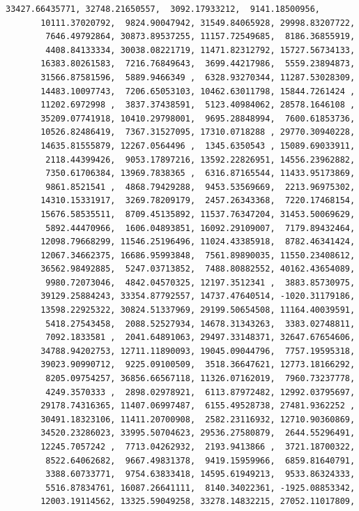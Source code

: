 \documentclass[11pt]{article}
\begin{document}
\begin{tcolorbox}[breakable, size=fbox, boxrule=.5pt, pad at break*=1mm, opacityfill=0]
\begin{Verbatim}[commandchars=\\\{\}]
       33427.66435771, 32748.21650557,  3092.17933212,  9141.18500956,
       10111.37020792,  9824.90047942, 31549.84065928, 29998.83207722,
        7646.49792864, 30873.89537255, 11157.72549685,  8186.36855919,
        4408.84133334, 30038.08221719, 11471.82312792, 15727.56734133,
       16383.80261583,  7216.76849643,  3699.44217986,  5559.23894873,
       31566.87581596,  5889.9466349 ,  6328.93270344, 11287.53028309,
       14483.10097743,  7206.65053103, 10462.63011798, 15844.7261424 ,
       11202.6972998 ,  3837.37438591,  5123.40984062, 28578.1646108 ,
       35209.07741918, 10410.29798001,  9695.28848994,  7600.61853736,
       10526.82486419,  7367.31527095, 17310.0718288 , 29770.30940228,
       14635.81555879, 12267.0564496 ,  1345.6350543 , 15089.69033911,
        2118.44399426,  9053.17897216, 13592.22826951, 14556.23962882,
        7350.61706384, 13969.7838365 ,  6316.87165544, 11433.95173869,
        9861.8521541 ,  4868.79429288,  9453.53569669,  2213.96975302,
       14310.15331917,  3269.78209179,  2457.26343368,  7220.17468154,
       15676.58535511,  8709.45135892, 11537.76347204, 31453.50069629,
        5892.44470966,  1606.04893851, 16092.29109007,  7179.89432464,
       12098.79668299, 11546.25196496, 11024.43385918,  8782.46341424,
       12067.34662375, 16686.95993848,  7561.89890035, 11550.23408612,
       36562.98492885,  5247.03713852,  7488.80882552, 40162.43654089,
        9980.72073046,  4842.04570325, 12197.3512341 ,  3883.85730975,
       39129.25884243, 33354.87792557, 14737.47640514, -1020.31179186,
       13598.22925322, 30824.51337969, 29199.50654508, 11164.40039591,
        5418.27543458,  2088.52527934, 14678.31343263,  3383.02748811,
        7092.1833581 ,  2041.64891063, 29497.33148371, 32647.67654606,
       34788.94202753, 12711.11890093, 19045.09044796,  7757.19595318,
       39023.90990712,  9225.09100509,  3518.36647621, 12773.18166292,
        8205.09754257, 36856.66567118, 11326.07162019,  7960.73237778,
        4249.3570333 ,  2898.02978921,  6113.87972482, 12992.03795697,
       29178.74316365, 11407.06997487,  6155.49528738, 27481.9362252 ,
       30491.18323106, 11411.20700908,  2582.23116932, 12710.90360869,
       34520.23286023, 33995.50704623, 29536.27580879,  2644.55296491,
       12245.7057242 ,  7713.04262932,  2193.9413866 ,  3721.18700322,
        8522.64062682,  9667.49831378,  9419.15959966,  6859.81640791,
        3388.60733771,  9754.63833418, 14595.61949213,  9533.86324333,
        5516.87834761, 16087.26641111,  8140.34022361, -1925.08853342,
       12003.19114562, 13325.59049258, 33278.14832215, 27052.11017809,

\end{Verbatim}
\end{tcolorbox}
\end{document}
